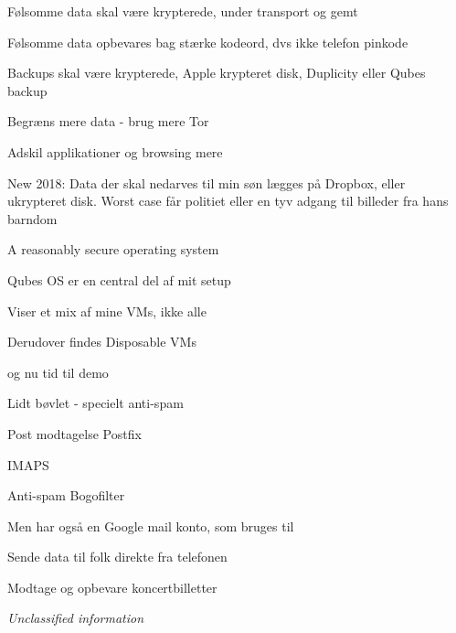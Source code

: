 \documentclass[18pt,landscape,a4paper,footrule]{foils}
\begin{document}
\begin{list1}
\item Følsomme data skal være krypterede, under transport og gemt
\item Følsomme data opbevares bag stærke kodeord, dvs ikke telefon pinkode
\item Backups skal være krypterede, Apple krypteret disk, Duplicity eller Qubes backup
\item Begræns mere data - brug mere Tor
\item Adskil applikationer og browsing mere
\item New 2018: Data der skal nedarves til min søn lægges på Dropbox, eller ukrypteret disk. Worst case får politiet eller en tyv adgang til billeder fra hans barndom
\end{list1}


A reasonably secure operating system \\


\vskip 2cm
\centerline{Qubes OS er en central del af mit setup}



\begin{list2}
\item Viser et mix af mine VMs, ikke alle
\item Derudover findes Disposable VMs
\item og nu tid til demo
\end{list2}


\begin{list2}
\item Lidt bøvlet - specielt anti-spam
\item Post modtagelse Postfix 
\item IMAPS 
\item Anti-spam Bogofilter 
\end{list2}

Men har også en Google mail konto, som bruges til
\begin{list2}
\item Sende data til folk direkte fra telefonen
\item Modtage og opbevare koncertbilletter
\item \emph{Unclassified information}
\end{list2}
\end{document}
